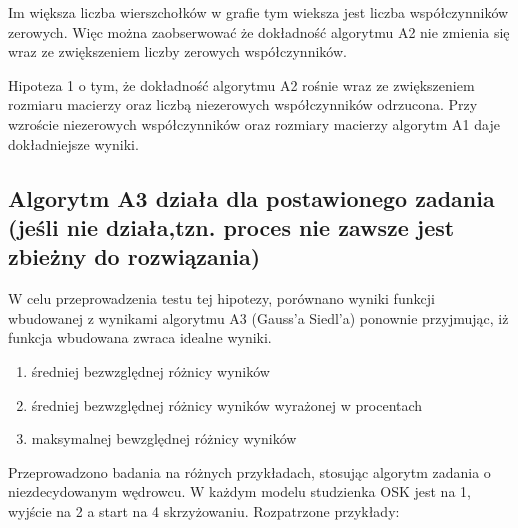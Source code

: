 \documentclass[12pt,a4paper]{article}
\begin{document}
Im większa liczba wierszchołków w grafie tym wieksza jest liczba współczynników zerowych. Więc można zaobserwować że dokładność algorytmu A2 nie zmienia się wraz ze zwiększeniem liczby zerowych współczynników.

Hipoteza 1 o tym, że dokładność algorytmu A2 rośnie wraz ze zwiększeniem rozmiaru macierzy oraz liczbą niezerowych współczynników odrzucona. Przy wzroście niezerowych współczynników oraz rozmiary macierzy algorytm A1 daje dokładniejsze wyniki.

\subsection{Algorytm A3 działa dla postawionego zadania (jeśli nie działa,tzn. proces nie zawsze jest zbieżny do rozwiązania)}

W celu przeprowadzenia testu tej hipotezy, porównano wyniki funkcji wbudowanej z wynikami algorytmu A3 (Gauss'a Siedl'a) ponownie przyjmując, iż funkcja wbudowana zwraca idealne wyniki.

\begin{enumerate}
    \item średniej bezwzględnej różnicy wyników
    \item średniej bezwzględnej różnicy wyników wyrażonej w procentach
    \item maksymalnej bewzględnej różnicy wyników
\end{enumerate}

Przeprowadzono badania na różnych przykładach, stosując algorytm zadania o niezdecydowanym wędrowcu. W każdym modelu studzienka OSK jest na 1, wyjście na 2 a start na 4 skrzyżowaniu. Rozpatrzone przykłady: 
\end{document}
